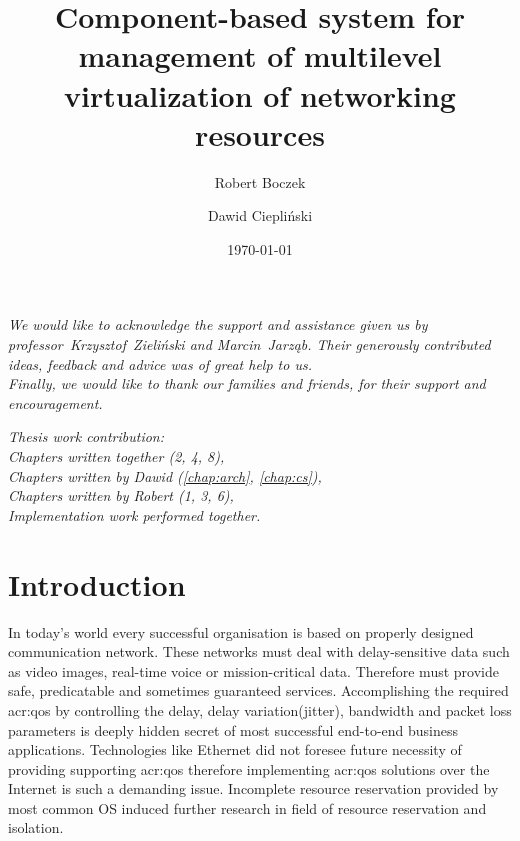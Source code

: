 \documentclass[11pt]{book}
\title{Component-based system for management of multilevel virtualization of networking resources}
\author{Robert Boczek \and Dawid Ciepliński}
\date{\today}
\begin{document}
  \maketitle

  \tableofcontents

  \listoffigures

  \newpage
	\vspace*{2in}

	\begin{center}
    \textit{We would like to acknowledge the support and assistance given us by professor~Krzysztof~Zieliński and
            Marcin~Jarząb. Their generously contributed ideas, feedback and advice was of great help to us. \\
            Finally, we would like to thank our families and friends, for their support and encouragement.}
  \end{center}

  \newpage
	\vspace*{2in}

	\begin{center}
   	\textit{Thesis work contribution: \\
            Chapters written together (2, 4, 8), \\
            Chapters written by Dawid (\ref{chap:arch}, \ref{chap:cs}), \\
            Chapters written by Robert (1, 3, 6), \\
            Implementation work performed together.}
  	\end{center}

  \chapter{Introduction}

	
  In today's world every successful organisation is based on properly designed communication network. These networks
  must deal with delay-sensitive data such as video images, real-time voice or mission-critical data. Therefore must
  provide safe, predicatable and sometimes guaranteed services. Accomplishing the required \gls{acr:qos} by controlling
  the delay, delay variation(jitter), bandwidth and packet loss parameters is deeply hidden secret of most successful
  end-to-end business applications. Technologies like Ethernet did not foresee future necessity of providing supporting
  \gls{acr:qos} therefore implementing \gls{acr:qos} solutions over the Internet is such a demanding issue. Incomplete 
 resource reservation provided by most common OS induced further research in field of resource reservation and isolation. 
\end{document}
